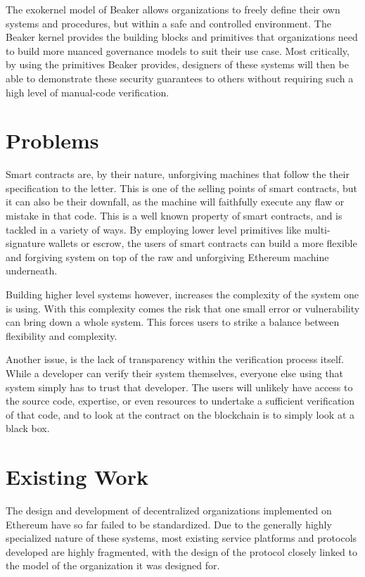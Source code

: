 \documentclass[english,a4paper]{article}
\begin{document}
The exokernel model of Beaker allows organizations to freely define
their own systems and procedures, but within a safe and controlled
environment. The Beaker kernel provides the building blocks and
primitives that organizations need to build more nuanced governance
models to suit their use case. Most critically, by using the primitives
Beaker provides, designers of these systems will then be able to
demonstrate these security guarantees to others without requiring such a high
level of manual-code verification.

\section{Problems}\label{problems}
Smart contracts are, by their nature, unforgiving machines that follow
the their specification to the letter. This is one of the selling points
of smart contracts, but it can also be their downfall, as the machine
will faithfully execute any flaw or mistake in that code. This is a well
known property of smart contracts, and is tackled in a variety of ways.
By employing lower level primitives like multi-signature wallets or
escrow, the users of smart contracts can build a more flexible and
forgiving system on top of the raw and unforgiving Ethereum machine
underneath.

Building higher level systems however, increases the complexity of the
system one is using. With this complexity comes the risk that one small
error or vulnerability can bring down a whole system. This forces users
to strike a balance between flexibility and complexity.

Another issue, is the lack of transparency within the verification
process itself. While a developer can verify their system themselves,
everyone else using that system simply has to trust that developer. The
users will unlikely have access to the source code, expertise, or even
resources to undertake a sufficient verification of that code, and to
look at the contract on the blockchain is to simply look at a black box.

\section{Existing Work}\label{existing-work}
The design and development of decentralized organizations implemented on
Ethereum have so far failed to be standardized. Due to the generally
highly specialized nature of these systems, most existing service
platforms and protocols developed are highly fragmented, with the design
of the protocol closely linked to the model of the organization it was
designed for.
\end{document}
